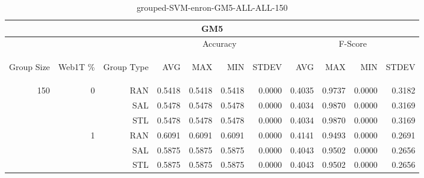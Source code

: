 \begin{center}
\begin{table}[htbp] 
 \begin{center}
\begin{tabular}{ | r | r | r | r | r | r | r | r | r | r | r |}
\hline
\multicolumn{11}{|c|}{GM5}\\
\hline
 & & & \multicolumn{4}{|c|}{Accuracy} & \multicolumn{4}{|c|}{F-Score}\\ \cline{4-11}
\begin{sideways}Group Size\end{sideways} & \begin{sideways}Web1T \%\end{sideways} & \begin{sideways}Group Type\end{sideways} & \begin{sideways}AVG\end{sideways} & \begin{sideways}MAX\end{sideways} & \begin{sideways}MIN\end{sideways} & \begin{sideways}STDEV\end{sideways} & \begin{sideways}AVG\end{sideways} & \begin{sideways}MAX\end{sideways} & \begin{sideways}MIN\end{sideways} & \begin{sideways}STDEV\end{sideways}\\
\hline
\multirow{6}{*}{150}
 & \multirow{3}{*}{0} & RAN & 0.5418 & 0.5418 & 0.5418 & 0.0000 & 0.4035 & 0.9737 & 0.0000 & 0.3182\\ \cline{3-11}
 &   & SAL & 0.5478 & 0.5478 & 0.5478 & 0.0000 & 0.4034 & 0.9870 & 0.0000 & 0.3169\\ \cline{3-11}
 &   & STL & 0.5478 & 0.5478 & 0.5478 & 0.0000 & 0.4034 & 0.9870 & 0.0000 & 0.3169\\ \cline{2-11}
 & \multirow{3}{*}{1} & RAN & 0.6091 & 0.6091 & 0.6091 & 0.0000 & 0.4141 & 0.9493 & 0.0000 & 0.2691\\ \cline{3-11}
 &   & SAL & 0.5875 & 0.5875 & 0.5875 & 0.0000 & 0.4043 & 0.9502 & 0.0000 & 0.2656\\ \cline{3-11}
 &   & STL & 0.5875 & 0.5875 & 0.5875 & 0.0000 & 0.4043 & 0.9502 & 0.0000 & 0.2656\\ \cline{2-11}
\hline
\end{tabular}
\caption{grouped-SVM-enron-GM5-ALL-ALL-150}
\end{center}
 \end{table}
\end{center}

